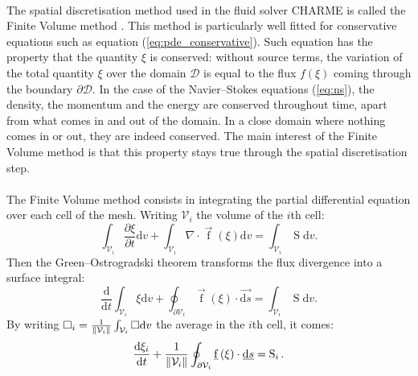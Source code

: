       \paragraph{}
      The spatial discretisation method used in the fluid solver CHARME is called the Finite Volume method \cite{EymardGallouetHerbin2000, Leterrier2003}.
      This method is particularly well fitted for conservative equations such as equation (\ref{eq:pde_conservative}).
      Such equation has the property that the quantity $\xi$ is conserved: without source terms, the variation of the total quantity $\xi$ over the domain $\mathcal{D}$ is equal to the flux $f\left(\xi\right)$ coming through the boundary $\partial\mathcal{D}$.
      In the case of the Navier--Stokes equations (\ref{eq:ns}), the density, the momentum and the energy are conserved throughout time, apart from what comes in and out of the domain.
      In a close domain where nothing comes in or out, they are indeed conserved.
      The main interest of the Finite Volume method is that this property stays true through the spatial discretisation step.

      \paragraph{}
      The Finite Volume method consists in integrating the partial differential equation over each cell of the mesh.
      Writing $\mathcal{V}_i$ the volume of the $i$th cell:
      \begin{equation}
        \int_{\mathcal{V}_i} \frac{\partial \xi}{\partial t} \mathrm{d}v + \int_{\mathcal{V}_i} \nabla\cdot \vec{\operatorname{f}}\left(\xi\right) \mathrm{d}v = \int_{\mathcal{V}_i} \operatorname{S} \mathrm{d}v .
      \end{equation}
      Then the Green--Ostrogradski theorem transforms the flux divergence into a surface integral:
      \begin{equation}
        \frac{\mathrm{d}}{\mathrm{d} t} \int_{\mathcal{V}_i} \xi\mathrm{d}v + \oint_{\partial\mathcal{V}_i} \vec{\operatorname{f}}\left(\xi\right) \cdot \vec{\mathrm{d}s} = \int_{\mathcal{V}_i} \operatorname{S} \mathrm{d}v .
      \end{equation}
      By writing $\square_i = \frac{1}{\norm{\mathcal{V}_i}} \int_{\mathcal{V}_i} \square \mathrm{d}v$ the average in the $i$th cell, it comes:
      \begin{equation}
        \frac{\mathrm{d}\xi_i}{\mathrm{d} t}  + \frac{1}{\norm{\mathcal{V}_i}} \oint_{\partial\mathcal{V}_i} \vec{\operatorname{f}}\left(\xi\right) \cdot \vec{\mathrm{d}s} = \operatorname{S}_i .
      \end{equation}

